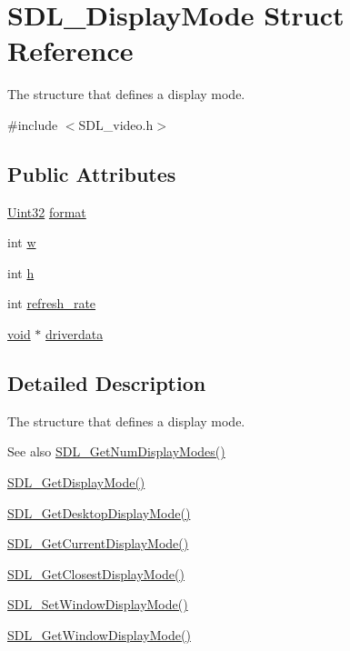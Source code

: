 \hypertarget{struct_s_d_l___display_mode}{}\section{S\+D\+L\+\_\+\+Display\+Mode Struct Reference}
\label{struct_s_d_l___display_mode}


The structure that defines a display mode.  




{\ttfamily \#include $<$S\+D\+L\+\_\+video.\+h$>$}

\subsection*{Public Attributes}
\begin{DoxyCompactItemize}
\item 
\hyperlink{_s_d_l__stdinc_8h_add440eff171ea5f55cb00c4a9ab8672d}{Uint32} \hyperlink{struct_s_d_l___display_mode_ae8120e0a18a99992f039756e1b503680}{format}
\item 
int \hyperlink{struct_s_d_l___display_mode_a504bb5e21950b719a0df43be51199046}{w}
\item 
int \hyperlink{struct_s_d_l___display_mode_a0d9eabed50a560ed553af772c26632d7}{h}
\item 
int \hyperlink{struct_s_d_l___display_mode_ad1b5783c9b292ebf24ad4e0e7a98e540}{refresh\+\_\+rate}
\item 
\hyperlink{_s_d_l__opengles2__gl2ext_8h_ae5d8fa23ad07c48bb609509eae494c95}{void} $\ast$ \hyperlink{struct_s_d_l___display_mode_a411f93025411da873f37a384ae62bbcf}{driverdata}
\end{DoxyCompactItemize}


\subsection{Detailed Description}
The structure that defines a display mode. 

\begin{DoxySeeAlso}{See also}
\hyperlink{_s_d_l__video_8h_a5abcf18592f00019c517e791f8ba53fc}{S\+D\+L\+\_\+\+Get\+Num\+Display\+Modes()} 

\hyperlink{_s_d_l__video_8h_a0a53e003ec6ad24dd2bbbcd0ad297311}{S\+D\+L\+\_\+\+Get\+Display\+Mode()} 

\hyperlink{_s_d_l__video_8h_ab97bca68fc068a6ecc3db473c4c0defd}{S\+D\+L\+\_\+\+Get\+Desktop\+Display\+Mode()} 

\hyperlink{_s_d_l__video_8h_a14dce1cb33085b36f08d27b3d8f2335b}{S\+D\+L\+\_\+\+Get\+Current\+Display\+Mode()} 

\hyperlink{_s_d_l__video_8h_a794be92ee0a9efca226fa19a635fa470}{S\+D\+L\+\_\+\+Get\+Closest\+Display\+Mode()} 

\hyperlink{_s_d_l__video_8h_a2ca17d1e857d1560738e002c9935088a}{S\+D\+L\+\_\+\+Set\+Window\+Display\+Mode()} 

\hyperlink{_s_d_l__video_8h_a8185547bc7cb0bbeb400f459792d081a}{S\+D\+L\+\_\+\+Get\+Window\+Display\+Mode()} 
\end{DoxySeeAlso}


